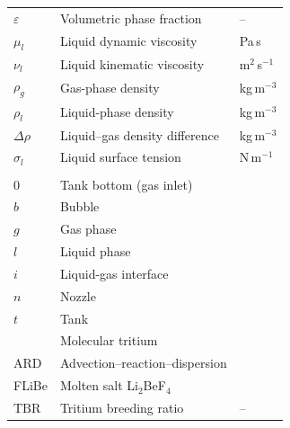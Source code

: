 \begin{xltabular}{\linewidth}{@{}l X l@{}}
\addlinespace[1em]
 \\
\midrule
$\varepsilon$ & Volumetric phase fraction                   & -- \\
$\mu_l$       & Liquid dynamic viscosity                    & Pa\,s \\
$\nu_l$       & Liquid kinematic viscosity                  & m$^2$\,s$^{-1}$ \\
$\rho_g$      & Gas-phase density                           & kg\,m$^{-3}$ \\
$\rho_l$      & Liquid-phase density                        & kg\,m$^{-3}$ \\
$\Delta\rho$  & Liquid--gas density difference              & kg\,m$^{-3}$ \\
$\sigma_l$    & Liquid surface tension                      & N\,m$^{-1}$ \\

\addlinespace[1em]
 \\
\midrule
$0$    & Tank bottom (gas inlet)             & \\
$b$    & Bubble                              & \\
$g$    & Gas phase                           & \\
$l$    & Liquid phase                        & \\
$i$    & Liquid-gas interface                & \\
$n$    & Nozzle                              & \\
$t$    & Tank                                & \\
  & Molecular tritium                   & \\
ARD    & Advection--reaction--dispersion     & \\
FLiBe  & Molten salt Li$_2$BeF$_4$           & \\
$\mathrm{TBR}$ & Tritium breeding ratio       & -- \\

\end{xltabular}

